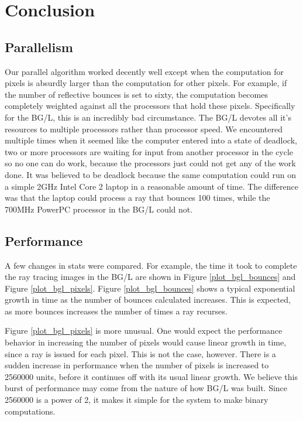 \documentclass{acmsiggraph}
\begin{document}
\section{Conclusion}
\subsection{Parallelism}
Our parallel algorithm worked decently well except when the computation for pixels
is absurdly larger than the computation for other pixels. For example, if the
number of reflective bounces is set to sixty, the computation becomes completely
weighted against all the processors that hold these pixels. Specifically for
the BG/L, this is an incredibly bad circumstance. The BG/L devotes all it's
resources to multiple processors rather than processor speed. We encountered
multiple times when it seemed like the computer entered into a state of deadlock,
two or more processors are waiting for input from another processor in the cycle
so no one can do work, because the processors just could not get any of the work
done. It was believed to be deadlock because the same computation could run on a
simple 2GHz Intel Core 2\texttrademark{} laptop in a reasonable amount of time.
The difference was that the laptop could process a ray that bounces 100 times,
while the 700MHz PowerPC processor in the BG/L could not.

\subsection{Performance}
A few changes in stats were compared.  For example, the time it took to complete
the ray tracing images in the BG/L are shown in Figure \ref{plot_bgl_bounces} and
Figure  \ref{plot_bgl_pixels}.  Figure \ref{plot_bgl_bounces} shows a typical
exponential growth in time as the number of bounces calculated increases.
This is expected, as more bounces increases the number of times a ray recurses.

Figure \ref{plot_bgl_pixels} is more unusual.  One would expect the performance
behavior in increasing the number of pixels would cause linear growth in time,
since a ray is issued for each pixel.  This is not the case, however.
There is a sudden increase in performance when the number of pixels is increased
to 2560000 units, before it continues off with its usual linear growth. 
We believe this burst of performance may come from the nature of how BG/L was built.
Since 2560000 is a power of 2, it makes it simple for the system to make
binary computations.
\end{document}
